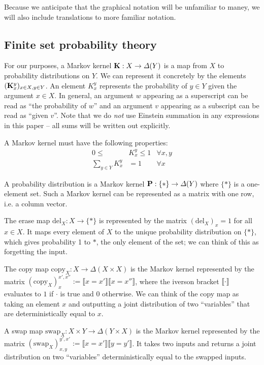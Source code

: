Because we anticipate that the graphical notation will be unfamiliar  to maney, we will also include translations to more familiar notation.

\subsection{Finite set probability theory}

For our purposes, a Markov kernel $\mathbf{K}:X\to \Delta(Y)$ is a map from $X$ to probability distributions on $Y$. We can represent it concretely by the elements $(\mathbf{K}_{x}^y)_{x\in X, y\in Y}$. An element $K_x^y$ represents the probability of $y\in Y$ given the argument $x\in X$. In general, an argument $w$ appearing as a superscript can be read as ``the probability of $w$'' and an argument $v$ appearing as a subscript can be read as ``given $v$''. Note that we do \emph{not} use Einstein summation in any expressions in this paper -- all sums will be written out explicitly.

A Markov kernel must have the following properties:
\begin{align}
	0\leq &K_{x}^y \leq 1 &\forall x,y\\
	\sum_{y\in Y} K_{x}^y &= 1 & \forall x
\end{align}

A probability distribution is a Markov kernel $\mathbf{P}:\{*\}\to \Delta(Y)$ where $\{*\}$ is a one-element set. Such a Markov kernel can be represented as a matrix with one row, i.e. a column vector.

The erase map $\text{del}_X:X\to \{*\}$ is represented by the matrix $(\text{del}_X)_x = 1$ for all $x\in X$. It maps every element of $X$ to the unique probability distribution on $\{*\}$, which gives probability 1 to $*$, the only element of the set; we can think of this as forgetting the input.

The copy map $\text{copy}_X: X\to \Delta(X\times X)$ is the Markov kernel represented by the matrix $(\text{copy}_X)_x^{x',x''}:= \llbracket x = x' \rrbracket \llbracket x=x''\rrbracket$, where the iverson bracket $\llbracket \cdot \rrbracket$ evaluates to $1$ if $\cdot$ is true and $0$ otherwise. We can think of the copy map as taking an element $x$ and outputting a joint distribution of two ``variables'' that are deterministically equal to $x$.

A swap map $\text{swap}_X: X\times Y \to \Delta(Y\times X)$ is the Markov kernel represented by the matrix $(\text{swap}_X)_{x,y}^{y',x'}:=\llbracket x=x' \rrbracket \llbracket y=y'\rrbracket$. It takes two inputs and returns a joint distribution on two ``variables'' deterministically equal to the swapped inputs.

